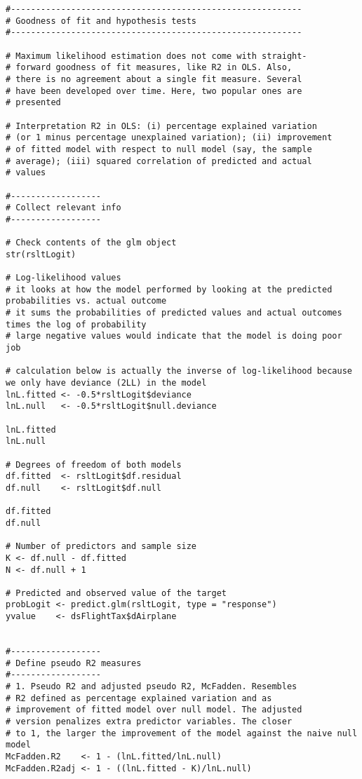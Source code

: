 \documentclass{article}
\begin{document}
\begin{tiny}
\begin{verbatim}
#----------------------------------------------------------
# Goodness of fit and hypothesis tests
#----------------------------------------------------------

# Maximum likelihood estimation does not come with straight-
# forward goodness of fit measures, like R2 in OLS. Also, 
# there is no agreement about a single fit measure. Several 
# have been developed over time. Here, two popular ones are
# presented

# Interpretation R2 in OLS: (i) percentage explained variation
# (or 1 minus percentage unexplained variation); (ii) improvement
# of fitted model with respect to null model (say, the sample
# average); (iii) squared correlation of predicted and actual
# values

#------------------
# Collect relevant info
#------------------

# Check contents of the glm object
str(rsltLogit)

# Log-likelihood values
# it looks at how the model performed by looking at the predicted probabilities vs. actual outcome
# it sums the probabilities of predicted values and actual outcomes times the log of probability
# large negative values would indicate that the model is doing poor job

# calculation below is actually the inverse of log-likelihood because we only have deviance (2LL) in the model
lnL.fitted <- -0.5*rsltLogit$deviance
lnL.null   <- -0.5*rsltLogit$null.deviance

lnL.fitted
lnL.null

# Degrees of freedom of both models
df.fitted  <- rsltLogit$df.residual
df.null    <- rsltLogit$df.null

df.fitted
df.null

# Number of predictors and sample size
K <- df.null - df.fitted
N <- df.null + 1

# Predicted and observed value of the target
probLogit <- predict.glm(rsltLogit, type = "response")
yvalue    <- dsFlightTax$dAirplane


#------------------
# Define pseudo R2 measures
#------------------
# 1. Pseudo R2 and adjusted pseudo R2, McFadden. Resembles 
# R2 defined as percentage explained variation and as 
# improvement of fitted model over null model. The adjusted 
# version penalizes extra predictor variables. The closer
# to 1, the larger the improvement of the model against the naive null model
McFadden.R2    <- 1 - (lnL.fitted/lnL.null)
McFadden.R2adj <- 1 - ((lnL.fitted - K)/lnL.null)


\end{verbatim}
\end{tiny}
\end{document}
